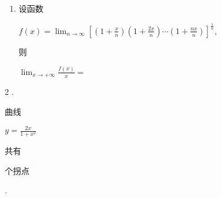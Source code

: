 \documentclass[10pt]{article}
\begin{document}
\begin{enumerate}
  \item \begin{CJK}{UTF8}{mj}设函数\end{CJK} $f(x)=\lim _{n \rightarrow \infty}\left[\left(1+\frac{x}{n}\right)\left(1+\frac{2 x}{n}\right) \cdots\left(1+\frac{n x}{n}\right)\right]^{\frac{1}{n}}$, \begin{CJK}{UTF8}{mj}则\end{CJK} $\lim _{x \rightarrow+\infty} \frac{f(x)}{x}=$
\end{enumerate}
2 . \begin{CJK}{UTF8}{mj}曲线\end{CJK} $y=\frac{2 x}{1+x^{2}}$ \begin{CJK}{UTF8}{mj}共有\end{CJK} \begin{CJK}{UTF8}{mj}个拐点\end{CJK}.
\end{document}
